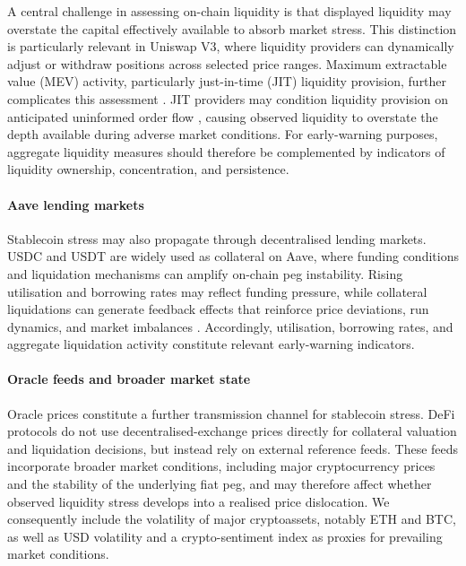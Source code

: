 \documentclass[a4paper,fleqn]{cas-sc}
\begin{document}
A central challenge in assessing on-chain liquidity is that displayed liquidity may overstate the capital effectively available to absorb market stress. This distinction is particularly relevant in Uniswap V3, where liquidity providers can dynamically adjust or withdraw positions across selected price ranges. Maximum extractable value (MEV) activity, particularly just-in-time (JIT) liquidity provision, further complicates this assessment \citep{xiong2023}. JIT providers may condition liquidity provision on anticipated uninformed order flow \citep{capponi2024}, causing observed liquidity to overstate the depth available during adverse market conditions. For early-warning purposes, aggregate liquidity measures should therefore be complemented by indicators of liquidity ownership, concentration, and persistence.

\paragraph{Aave lending markets}

Stablecoin stress may also propagate through decentralised lending markets. USDC and USDT are widely used as collateral on Aave, where funding conditions and liquidation mechanisms can amplify on-chain peg instability. Rising utilisation and borrowing rates may reflect funding pressure, while collateral liquidations can generate feedback effects that reinforce price deviations, run dynamics, and market imbalances \citep{P2Plending}. Accordingly, utilisation, borrowing rates, and aggregate liquidation activity constitute relevant early-warning indicators.

\paragraph{Oracle feeds and broader market state}

Oracle prices constitute a further transmission channel for stablecoin stress. DeFi protocols do not use decentralised-exchange prices directly for collateral valuation and liquidation decisions, but instead rely on external reference feeds. These feeds incorporate broader market conditions, including major cryptocurrency prices and the stability of the underlying fiat peg, and may therefore affect whether observed liquidity stress develops into a realised price dislocation. We consequently include the volatility of major cryptoassets, notably ETH and BTC, as well as USD volatility and a crypto-sentiment index as proxies for prevailing market conditions.
\end{document}
